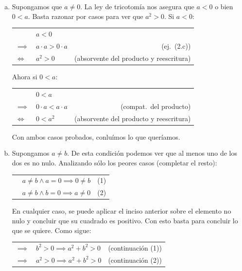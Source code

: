 \begin{enumerate}[(a)]
          Con ambas direcciones verificadas, concluimos que vale la equivalencia.

    \item Supongamos que $a \ne 0$. La ley de tricotomía nos asegura que $a < 0$ o bien $0 < a$.
          Basta razonar por casos para ver que $a^2 > 0$. Si $a < 0$:

          \begin{tabular}{|l l r}
             & $a < 0$ & \\
            $\implies$ & $a \cdot a > 0 \cdot a$ & (ej.\ (2.c)) \\
            $\iff$ & $a^2 > 0$ & (absorvente del producto y reescritura) \\
          \end{tabular}

          Ahora si $0 < a$:

          \begin{tabular}{|l l r}
             & $0 < a$ & \\
            $\implies$ & $0 \cdot a < a \cdot a$ & (compat.\ del producto) \\
            $\iff$ & $0 < a^2$ & (absorvente del producto y reescritura) \\
          \end{tabular}

          Con ambos casos probados, conluímos lo que queríamos.

    \item Supongamos $a \neq b$. De esta condición podemos ver que al menos uno de los dos es no nulo.
          Analizando sólo los peores casos (completar el resto):
          
          \begin{tabular}{|l l r}
             & $a \neq b \land a = 0 \implies 0 \neq b$ & (1) \\
             & $a \neq b \land b = 0 \implies a \neq 0$ & (2) \\
          \end{tabular}

          En cualquier caso, se puede aplicar el inciso anterior sobre el elemento no nulo y concluir que su cuadrado es positivo.
          Con esto basta para concluir lo que se quiere. Como sigue:

          \begin{tabular}{|l l r}
            $\implies$ & $b^2 > 0 \implies a^2 + b^2 > 0$ & (continuación (1)) \\
            $\implies$ & $a^2 > 0 \implies a^2 + b^2 > 0$ & (continuación (2)) \\
          \end{tabular}
\end{enumerate}
